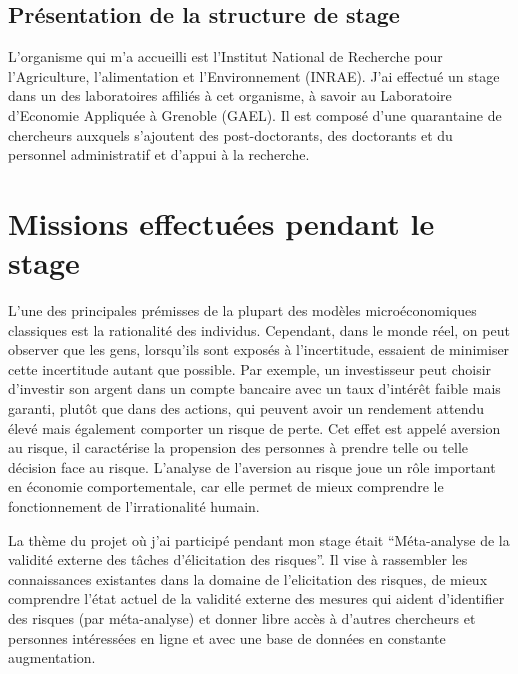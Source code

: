 \documentclass[12pt]{article}
\begin{document}
\subsection{Présentation de la structure de stage}

L'organisme qui m'a accueilli est l'Institut National de Recherche pour
l'Agriculture, l'alimentation et l'Environnement (INRAE). J'ai effectué
un stage dans un des laboratoires affiliés à cet organisme, à savoir au
Laboratoire d'Economie Appliquée à Grenoble (GAEL). Il est composé d'une
quarantaine de chercheurs auxquels s'ajoutent des post-doctorants, des
doctorants et du personnel administratif et d'appui à la recherche.

\section{Missions effectuées pendant le stage}
\label{sec:third}

L'une des principales prémisses de la plupart des modèles
microéconomiques classiques est la rationalité des individus. Cependant,
dans le monde réel, on peut observer que les gens, lorsqu'ils sont
exposés à l'incertitude, essaient de minimiser cette incertitude autant
que possible. Par exemple, un investisseur peut choisir d'investir son
argent dans un compte bancaire avec un taux d'intérêt faible mais
garanti, plutôt que dans des actions, qui peuvent avoir un rendement
attendu élevé mais également comporter un risque de perte. Cet effet est
appelé aversion au risque, il caractérise la propension des personnes à
prendre telle ou telle décision face au risque. L'analyse de l'aversion
au risque joue un rôle important en économie comportementale, car elle
permet de mieux comprendre le fonctionnement de l'irrationalité humain.

La thème du projet où j'ai participé pendant mon stage était
``Méta-analyse de la validité externe des tâches d'élicitation des
risques''. Il vise à rassembler les connaissances existantes dans la
domaine de l'elicitation des risques, de mieux comprendre l'état actuel
de la validité externe des mesures qui aident d'identifier des risques
(par méta-analyse) et donner libre accès à d'autres chercheurs et
personnes intéressées en ligne et avec une base de données en constante
augmentation.
\end{document}
